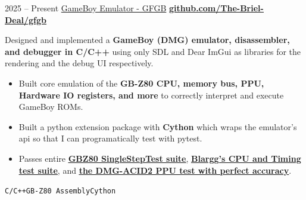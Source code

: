 \documentclass[9pt]{developercv} %
\begin{document}

\begin{entrylist}
  \entry
  {2025 -- Present}
  {\href{https://github.com/The-Briel-Deal/gfgb}{GameBoy Emulator - GFGB}}
  {\href{https://github.com/The-Briel-Deal/gfgb}{\ul{\textbf{github.com/The-Briel-Deal/gfgb}}}}
  {
    Designed and implemented a \textbf{GameBoy (DMG) emulator, disassembler,
    and debugger in C/C++} using only SDL and Dear ImGui as libraries for the
    rendering and the debug UI respectively.

    \begin{itemize}[leftmargin=\parindent, leftmargin=*]
      \item Built core emulation of the \textbf{GB-Z80 CPU, memory bus, PPU,
        Hardware IO registers, and more} to correctly interpret and execute
        GameBoy ROMs.
      \item Built a python extension package with \textbf{Cython} which wraps the emulator's api so
        that I can programatically test with pytest.
      \item Passes entire
        \href{https://github.com/SingleStepTests/sm83}{\ul{\textbf{GBZ80
        SingleStepTest suite}}},
        \href{https://gbdev.gg8.se/files/roms/blargg-gb-tests/}{\ul{\textbf{Blargg's
        CPU and Timing test suite}}}, and
        \href{https://github.com/mattcurrie/dmg-acid2}{\ul{\textbf{the
        DMG-ACID2 PPU test with perfect accuracy}}}.
    \end{itemize}

  \texttt{C/C++}\slashsep\texttt{GB-Z80 Assembly}\slashsep\texttt{Cython}}
\end{entrylist}
\end{document}
